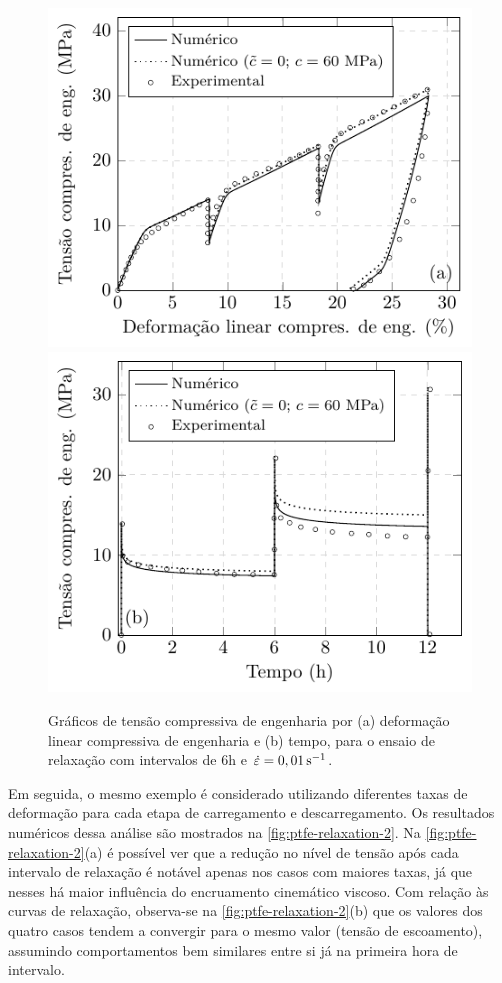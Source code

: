\documentclass[Tese.tex]{subfiles}
\begin{document}
{\begin{figure}[!htb]
	\centering
	\caption{Gráficos de tensão compressiva de engenharia por (a) deformação linear compressiva de engenharia e (b) tempo, para o ensaio de relaxação com intervalos de $6$h e $\dot{{\varepsilon}}=0,01\,\text{s}^{-1}$.}
	\label{fig:ptfe-relaxation}
	\includegraphics[scale=1.0]{Figuras/PTFE/Relaxation.pdf}\;\;\includegraphics[scale=1.0]{Figuras/PTFE/Relaxation-s.pdf}		
\end{figure}

Em seguida, o mesmo exemplo é considerado utilizando diferentes taxas de deformação para cada etapa de carregamento e descarregamento. Os resultados numéricos dessa análise são mostrados na \autoref{fig:ptfe-relaxation-2}. Na \autoref{fig:ptfe-relaxation-2}(a) é possível ver que a redução no nível de tensão após cada intervalo de relaxação é notável apenas nos casos com maiores taxas, já que nesses há maior influência do encruamento cinemático viscoso. Com relação às curvas de relaxação, observa-se na \autoref{fig:ptfe-relaxation-2}(b) que os valores dos quatro casos tendem a convergir para o mesmo valor (tensão de escoamento), assumindo comportamentos bem similares entre si já na primeira hora de intervalo.

}
\end{document}
